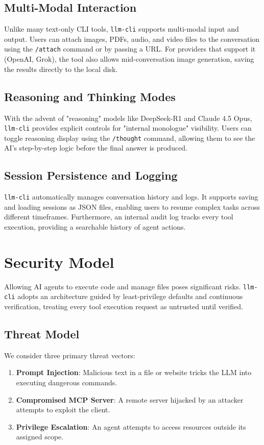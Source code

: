 \documentclass[conference]{IEEEtran}
\begin{document}
\subsection{Multi-Modal Interaction}
Unlike many text-only CLI tools, \texttt{llm-cli} supports multi-modal input and output. Users can attach images, PDFs, audio, and video files to the conversation using the \texttt{/attach} command or by passing a URL. For providers that support it (OpenAI, Grok), the tool also allows mid-conversation image generation, saving the results directly to the local disk.

\subsection{Reasoning and Thinking Modes}
With the advent of "reasoning" models like DeepSeek-R1 and Claude 4.5 Opus, \texttt{llm-cli} provides explicit controls for "internal monologue" visibility. Users can toggle reasoning display using the \texttt{/thought} command, allowing them to see the AI's step-by-step logic before the final answer is produced.

\subsection{Session Persistence and Logging}
\texttt{llm-cli} automatically manages conversation history and logs. It supports saving and loading sessions as JSON files, enabling users to resume complex tasks across different timeframes. Furthermore, an internal audit log tracks every tool execution, providing a searchable history of agent actions.

\section{Security Model}

Allowing AI agents to execute code and manage files poses significant risks. \texttt{llm-cli} adopts an architecture guided by least-privilege defaults and continuous verification, treating every tool execution request as untrusted until verified.

\subsection{Threat Model}
We consider three primary threat vectors:
\begin{enumerate}
    \item \textbf{Prompt Injection}: Malicious text in a file or website tricks the LLM into executing dangerous commands.
    \item \textbf{Compromised MCP Server}: A remote server hijacked by an attacker attempts to exploit the client.
    \item \textbf{Privilege Escalation}: An agent attempts to access resources outside its assigned scope.
\end{enumerate}
\end{document}

